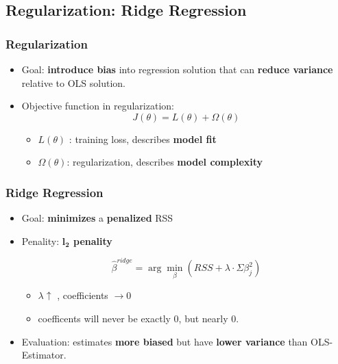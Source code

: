 \subsection{Regularization: Ridge Regression}
\subsubsection{Regularization}
\begin{itemize}
	\item Goal: \textbf{introduce bias} into regression solution that can \textbf{reduce variance} relative to OLS solution.
	\item Objective function in regularization:
	$$J(\theta) = L(\theta) + \Omega(\theta)$$
	\begin{itemize}
		\item $L(\theta)$ : training loss, describes \textbf{model fit}
		\item $\Omega(\theta)$: regularization, describes \textbf{model complexity} 
	\end{itemize}
\end{itemize}

\subsubsection{Ridge Regression}
\begin{itemize}
	\item Goal: \textbf{minimizes} a \textbf{penalized} RSS
	\item Penality: \textbf{$\mathbf{l_2}$ penality}
	
	$$\hat{\beta}^{ridge} = \arg\min_{\beta} (RSS + \lambda \cdot\Sigma \beta_j^2)$$
	\begin{itemize}
		\item $\lambda \uparrow$ , coefficients $\rightarrow 0$ 
		\item coefficents will never be exactly 0, but nearly 0.
	\end{itemize}
	\item Evaluation: estimates \textbf{more biased} but have \textbf{lower variance} than OLS-Estimator. 
\end{itemize}


